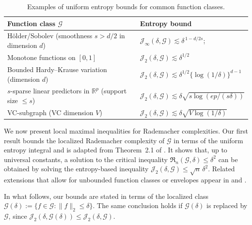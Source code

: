 \documentclass[11pt]{article}
\theoremstyle{plain}
\theoremstyle{definition} %
\begin{document}
\begin{table}[h]
\centering
\caption{Examples of uniform entropy bounds for common function classes.}
\label{tab:uniform_entropy_examples}
\begin{tabular}{|ll|}
\hline
Function class $\mathcal{G}$ & Entropy bound \\
\hline
H\"older/Sobolev (smoothness $s>d/2$ in dimension $d$)
& $\mathcal{J}_{\infty}(\delta,\mathcal{G}) \lesssim \delta^{\,1-d/2s}$;\\
Monotone functions on $[0,1]$  
& $\mathcal{J}_2(\delta,\mathcal{G}) \lesssim \delta^{1/2}$
\\
Bounded Hardy--Krause variation (dimension $d$)
& $\mathcal{J}_{2}(\delta,\mathcal{G}) \lesssim \delta^{1/2}\{\log(1/\delta)\}^{d-1}$
\\
$s$-sparse linear predictors in $\mathbb{R}^p$ (support size $\le s$)
& $\mathcal{J}_2(\delta,\mathcal{G}) \lesssim \delta\sqrt{s\log(ep/(s\delta))}$ \\
VC-subgraph (VC dimension $V$)
& $\mathcal{J}_2(\delta,\mathcal{G}) \lesssim \delta\sqrt{V\log(1/\delta)}$
\\
\hline
\end{tabular}
\end{table}












We now present local maximal inequalities for Rademacher complexities. Our first result bounds the localized Rademacher complexity of \(\mathcal{G}\) in terms of the uniform entropy integral and is adapted from Theorem~2.1 of \cite{van2011local}. It shows that, up to universal constants, a solution to the critical inequality \(\mathfrak{R}_n(\mathcal{G},\delta)\le \delta^2\) can be obtained by solving the entropy-based inequality \(\mathcal{J}_2(\delta,\mathcal{G}) \le \sqrt{n}\,\delta^2\). Related extensions that allow for unbounded function classes or envelopes appear in \cite{chernozhukov2014gaussian} and \cite{vaart2023empirical}.

In what follows, our bounds are stated in terms of the localized class
\(\mathcal{G}(\delta) := \{f \in \mathcal{G}: \|f\|_2 \le \delta\}\). The same conclusion holds if \(\mathcal{G}(\delta)\) is replaced by \(\mathcal{G}\), since \(\mathcal{J}_2(\delta,\mathcal{G}(\delta)) \le \mathcal{J}_2(\delta,\mathcal{G})\).
\end{document}
